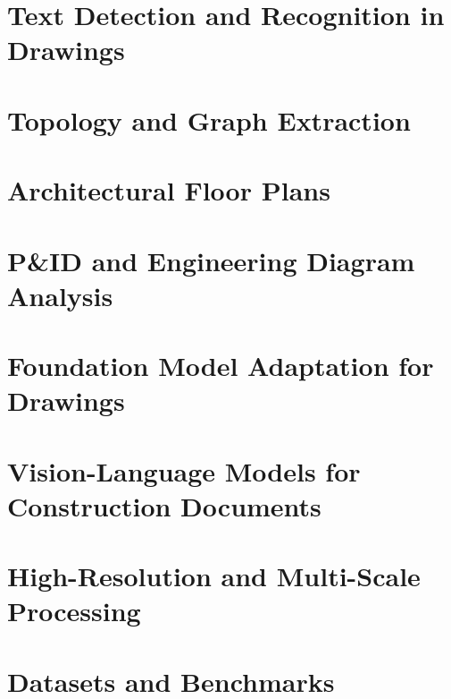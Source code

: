 \documentclass[journal]{IEEEtran}
\begin{document}
\section{Text Detection and Recognition in Drawings}
\label{sec:text_recognition}

\section{Topology and Graph Extraction}
\label{sec:topology}

\section{Architectural Floor Plans}
\label{sec:floor_plans}

\section{P\&ID and Engineering Diagram Analysis}
\label{sec:engineering_diagrams}

\section{Foundation Model Adaptation for Drawings}
\label{sec:foundation_models}

\section{Vision-Language Models for Construction Documents}
\label{sec:vlm}

\section{High-Resolution and Multi-Scale Processing}
\label{sec:high_resolution}

\section{Datasets and Benchmarks}
\label{sec:datasets}
\end{document}
